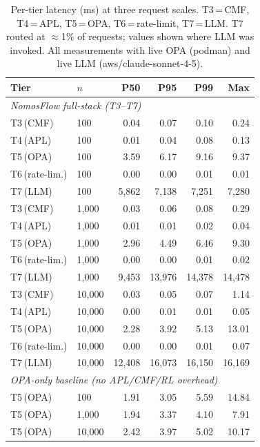 \begin{table}[t]
\centering
\small
\caption{Per-tier latency (ms) at three request scales.
  T3\,=\,CMF, T4\,=\,APL, T5\,=\,OPA, T6\,=\,rate-limit, T7\,=\,LLM.
  T7 routed at $\approx$1\% of requests; values shown where LLM was invoked.
  All measurements with live OPA (podman) and live LLM (aws/claude-sonnet-4-5).}
\label{tab:exp1-latency}
\begin{tabular}{llrrrr}
\hline
\textbf{Tier} & \textbf{$n$} & \textbf{P50} & \textbf{P95} & \textbf{P99} & \textbf{Max} \\
\hline
\multicolumn{6}{l}{\textit{NomosFlow full-stack (T3–T7)}} \\
T3\,(CMF)       & 100   & 0.04  & 0.07  & 0.10  & 0.24  \\
T4\,(APL)       & 100   & 0.01  & 0.04  & 0.08  & 0.13  \\
T5\,(OPA)       & 100   & 3.59  & 6.17  & 9.16  & 9.37  \\
T6\,(rate-lim.) & 100   & 0.00  & 0.00  & 0.01  & 0.01  \\
T7\,(LLM)       & 100   & 5{,}862 & 7{,}138 & 7{,}251 & 7{,}280 \\
\hline
T3\,(CMF)       & 1{,}000 & 0.03  & 0.06  & 0.08  & 0.29  \\
T4\,(APL)       & 1{,}000 & 0.01  & 0.01  & 0.02  & 0.04  \\
T5\,(OPA)       & 1{,}000 & 2.96  & 4.49  & 6.46  & 9.30  \\
T6\,(rate-lim.) & 1{,}000 & 0.00  & 0.00  & 0.01  & 0.02  \\
T7\,(LLM)       & 1{,}000 & 9{,}453 & 13{,}976 & 14{,}378 & 14{,}478 \\
\hline
T3\,(CMF)       & 10{,}000 & 0.03 & 0.05  & 0.07  & 1.14  \\
T4\,(APL)       & 10{,}000 & 0.00 & 0.01  & 0.01  & 0.05  \\
T5\,(OPA)       & 10{,}000 & 2.28 & 3.92  & 5.13  & 13.01 \\
T6\,(rate-lim.) & 10{,}000 & 0.00 & 0.00  & 0.01  & 0.07  \\
T7\,(LLM)       & 10{,}000 & 12{,}408 & 16{,}073 & 16{,}150 & 16{,}169 \\
\hline
\multicolumn{6}{l}{\textit{OPA-only baseline (no APL/CMF/RL overhead)}} \\
T5\,(OPA)       & 100   & 1.91 & 3.05 & 5.59 & 14.84 \\
T5\,(OPA)       & 1{,}000 & 1.94 & 3.37 & 4.10 & 7.91  \\
T5\,(OPA)       & 10{,}000& 2.42 & 3.97 & 5.02 & 10.17 \\
\hline
\end{tabular}
\end{table}

